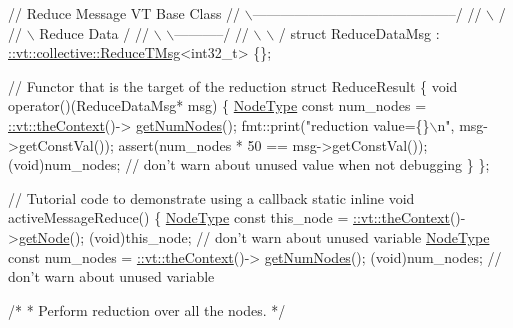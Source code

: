 \begin{DoxyCodeInclude}
\textcolor{comment}{//                       Reduce Message VT Base Class}
\textcolor{comment}{//                 \(\backslash\)--------------------------------------------/}
\textcolor{comment}{//                  \(\backslash\)                                          /}
\textcolor{comment}{//                   \(\backslash\)                            Reduce Data /}
\textcolor{comment}{//                    \(\backslash\)                          \(\backslash\)-----------/}
\textcolor{comment}{//                     \(\backslash\)                          \(\backslash\)         /}
\textcolor{keyword}{struct }ReduceDataMsg : \hyperlink{structvt_1_1collective_1_1reduce_1_1operators_1_1_reduce_t_msg}{::vt::collective::ReduceTMsg}<int32\_t> \{\};


\textcolor{comment}{// Functor that is the target of the reduction}
\textcolor{keyword}{struct }ReduceResult \{
  \textcolor{keywordtype}{void} operator()(ReduceDataMsg* msg) \{
    \hyperlink{namespacevt_a866da9d0efc19c0a1ce79e9e492f47e2}{NodeType} \textcolor{keyword}{const} num\_nodes = \hyperlink{namespacevt_a26551fe0e6e6a1371111df5b12c7e92c}{::vt::theContext}()->
      \hyperlink{structvt_1_1ctx_1_1_context_a7f41071aadf6d5fa9e1b6c703c5ff19d}{getNumNodes}();
    fmt::print(\textcolor{stringliteral}{"reduction value=\{\}\(\backslash\)n"}, msg->getConstVal());
    assert(num\_nodes * 50 == msg->getConstVal());
    (void)num\_nodes;  \textcolor{comment}{// don't warn about unused value when not debugging}
  \}
\};


\textcolor{comment}{// Tutorial code to demonstrate using a callback}
\textcolor{keyword}{static} \textcolor{keyword}{inline} \textcolor{keywordtype}{void} activeMessageReduce() \{
  \hyperlink{namespacevt_a866da9d0efc19c0a1ce79e9e492f47e2}{NodeType} \textcolor{keyword}{const} this\_node = \hyperlink{namespacevt_a26551fe0e6e6a1371111df5b12c7e92c}{::vt::theContext}()->\hyperlink{structvt_1_1ctx_1_1_context_a0d52c263ce8516546a67443d9a86fa5f}{getNode}();
  (void)this\_node;  \textcolor{comment}{// don't warn about unused variable}
  \hyperlink{namespacevt_a866da9d0efc19c0a1ce79e9e492f47e2}{NodeType} \textcolor{keyword}{const} num\_nodes = \hyperlink{namespacevt_a26551fe0e6e6a1371111df5b12c7e92c}{::vt::theContext}()->
      \hyperlink{structvt_1_1ctx_1_1_context_a7f41071aadf6d5fa9e1b6c703c5ff19d}{getNumNodes}();
  (void)num\_nodes;  \textcolor{comment}{// don't warn about unused variable}

  \textcolor{comment}{/*}
\textcolor{comment}{   * Perform reduction over all the nodes.}
\textcolor{comment}{   */}


\end{DoxyCodeInclude}
